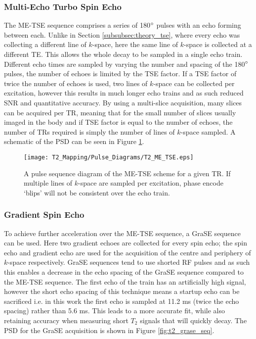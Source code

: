 \subsubsection{Multi-Echo Turbo Spin Echo}
The \acf{ME-TSE} sequence comprises a series of 180$\degree$ pulses with an echo forming between each. Unlike in Section \ref{subsubsec:theory_tse}, where every echo was collecting a different line of $k$-space, here the same line of $k$-space is collected at a different \ac{TE}. This allows the whole \ttwo decay to be sampled in a single echo train. Different echo times are sampled by varying the number and spacing of the 180$\degree$ pulses, the number of echoes is limited by the \ac{TSE} factor. If a \ac{TSE} factor of twice the number of echoes is used, two lines of $k$-space can be collected per excitation, however this results in much longer echo trains and as such reduced \ac{SNR} and quantitative accuracy. By using a multi-slice acquisition, many slices can be acquired per \ac{TR}, meaning that for the small number of slices usually imaged in the body and if \ac{TSE} factor is equal to the number of echoes, the number of \acp{TR} required is simply the number of lines of $k$-space sampled. A schematic of the \ac{PSD} can be seen in Figure \ref{fig:t2_me-tse_seq}.

\begin{figure}[H]
	\centering
	\texttt{[image: T2\_Mapping/Pulse\_Diagrams/T2\_ME\_TSE.eps]}
	\caption{A pulse sequence diagram of the \ac{ME-TSE} scheme for a given \ac{TR}. If multiple lines of $k$-space are sampled per excitation, phase encode `blips' will not be consistent over the echo train.}
	\label{fig:t2_me-tse_seq}	
\end{figure}

\newpage
\subsubsection{Gradient Spin Echo}

To achieve further acceleration over the \acf{ME-TSE} sequence, a \ac{GraSE} sequence can be used. Here two gradient echoes are collected for every spin echo; the spin echo and gradient echo are used for the acquisition of the centre and periphery of $k$-space respectively. \ac{GraSE} sequences tend to use shorted \ac{RF} pulses and as such this enables a decrease in the echo spacing of the \ac{GraSE} sequence compared to the \ac{ME-TSE} sequence. The first echo of the train has an artificially high signal, however the short echo spacing of this technique means a startup echo can be sacrificed i.e. in this work the first echo is sampled at 11.2 ms (twice the echo spacing) rather than 5.6 ms. This leads to a more accurate fit, while also retaining accuracy when measuring short $T_2$ signals that will quickly decay. The \ac{PSD} for the \ac{GraSE} acquisition is shown in Figure \ref{fig:t2_grase_seq}.


